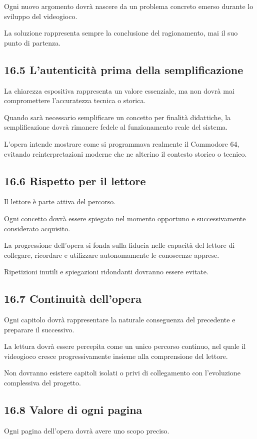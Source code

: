 \documentclass{article}
\begin{document}
Ogni nuovo argomento dovrà nascere da un problema concreto emerso durante lo sviluppo del videogioco.

La soluzione rappresenta sempre la conclusione del ragionamento, mai il suo punto di partenza.

\subsection[16.5 L{}'autenticità prima della semplificazione]{16.5 L'autenticità prima della semplificazione}
La chiarezza espositiva rappresenta un valore essenziale, ma non dovrà mai compromettere l'accuratezza tecnica o
storica.

Quando sarà necessario semplificare un concetto per finalità didattiche, la semplificazione dovrà rimanere fedele al
funzionamento reale del sistema.

L'opera intende mostrare come si programmava realmente il Commodore 64, evitando reinterpretazioni moderne che ne
alterino il contesto storico o tecnico.

\subsection{16.6 Rispetto per il lettore}
Il lettore è parte attiva del percorso.

Ogni concetto dovrà essere spiegato nel momento opportuno e successivamente considerato acquisito.

La progressione dell'opera si fonda sulla fiducia nelle capacità del lettore di collegare, ricordare e utilizzare
autonomamente le conoscenze apprese.

Ripetizioni inutili e spiegazioni ridondanti dovranno essere evitate.

\subsection[16.7 Continuità dell{}'opera]{16.7 Continuità dell'opera}
Ogni capitolo dovrà rappresentare la naturale conseguenza del precedente e preparare il successivo.

La lettura dovrà essere percepita come un unico percorso continuo, nel quale il videogioco cresce progressivamente
insieme alla comprensione del lettore.

Non dovranno esistere capitoli isolati o privi di collegamento con l'evoluzione complessiva del progetto.

\subsection{16.8 Valore di ogni pagina}
Ogni pagina dell'opera dovrà avere uno scopo preciso.
\end{document}
